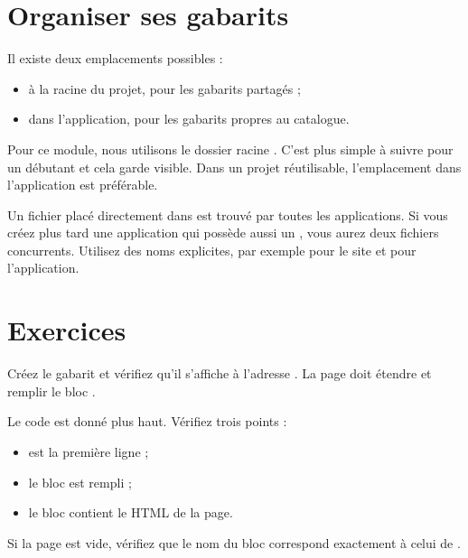 \section{Organiser ses gabarits}

Il existe deux emplacements possibles :
\begin{itemize}
  \item {} à la racine du projet, pour les gabarits partagés ;
  \item {} dans l'application, pour les
        gabarits propres au catalogue.
\end{itemize}

Pour ce module, nous utilisons le dossier racine . C'est plus
simple à suivre pour un débutant et cela garde  visible. Dans un
projet réutilisable, l'emplacement dans l'application est préférable.

\begin{piege}
Un fichier  placé directement dans  est trouvé par
toutes les applications. Si vous créez plus tard une application  qui
possède aussi un , vous aurez deux fichiers concurrents. Utilisez
des noms explicites, par exemple  pour le site et
 pour l'application.
\end{piege}

\section{Exercices}

\begin{exercice}
Créez le gabarit  et vérifiez qu'il
s'affiche à l'adresse . La page doit étendre  et
remplir le bloc .
\end{exercice}

\begin{correction}
Le code est donné plus haut. Vérifiez trois points :
\begin{itemize}
  \item {} est la première ligne ;
  \item le bloc  est rempli ;
  \item le bloc  contient le HTML de la page.
\end{itemize}
Si la page est vide, vérifiez que le nom du bloc correspond exactement à celui de
.
\end{correction}

